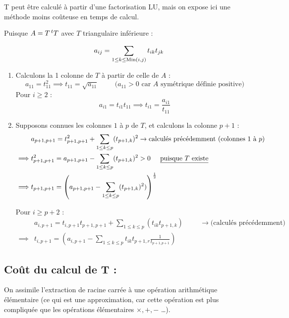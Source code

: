T peut être calculé à partir d'une factorisation LU, mais on expose ici une méthode moins coûteuse en temps de calcul.

Puisque $A = T \,^tT$ avec $T$ triangulaire inférieure :

\[
    a_{ij} = \sum_{1 \leq k \leq \operatorname{Min}(i,j)} t_{ik} t_{jk}
\]

\begin{enumerate}[label=-]
    \item Calculons la 1 colonne de $T$ à partir de celle de $A$ :
        \[
            a_{11} = t_{11}^2 \implies t_{11} = \sqrt{a_{11}} \hspace{1cm} 
            \text{($a_{11} > 0$ car $A$ symétrique définie positive)}
        \]
        Pour $i \geq 2$ :
        \[
            a_{i1} = t_{i1} t_{11} \implies t_{i1} = \frac{a_{i1}}{t_{11}}
        \]
    \item Supposons connues les colonnes $1$ à $p$ de $T$, et calculons la colonne $p+1$ :
        \begin{align*}
            & a_{p+1,p+1} = t_{p+1,p+1}^2 + \sum_{1 \leq k \leq p}(t_{p+1,k})^2 \to
            \text{calculés précédemment (colonnes 1 à $p$)} \\
            \implies & t_{p+1,p+1}^2 = a_{p+1,p+1} - \sum_{1 \leq k \leq p}(t_{p+1,k})^2 > 0 \hspace{0.5cm} \text{\underline{puisque $T$ existe}} \\
            \implies & t_{p+1,p+1} = \left(a_{p+1,p+1} - \sum_{1 \leq k \leq p}(t_{p+1,k})^2)\right)^{\frac{1}{2}}
        \end{align*}

        Pour $i \geq p+2$ :
        \begin{equation*}
            \begin{split}
                & a_{i,p+1} = t_{i,p+1} t_{p+1,p+1} + \sum_{1 \leq k \leq p}(t_{ik} t_{p+1,k})
            \hspace{1cm} \to \text{(calculés précédemment)} \\
                \implies & t_{i,p+1} = (a_{i,p+1} - \sum_{1 \leq k \leq p} t_{ik}t_{p+1,r} \frac{1}{t_{p+1,p+1}})
            \end{split}
        \end{equation*}

\end{enumerate}

\subsection*{Coût du calcul de T :}
On assimile l'extraction de racine carrée à une opération arithmétique élémentaire (ce qui est
une approximation, car cette opération est plus compliquée que les opérations élémentaires
$\times, +, -$ \dots).

